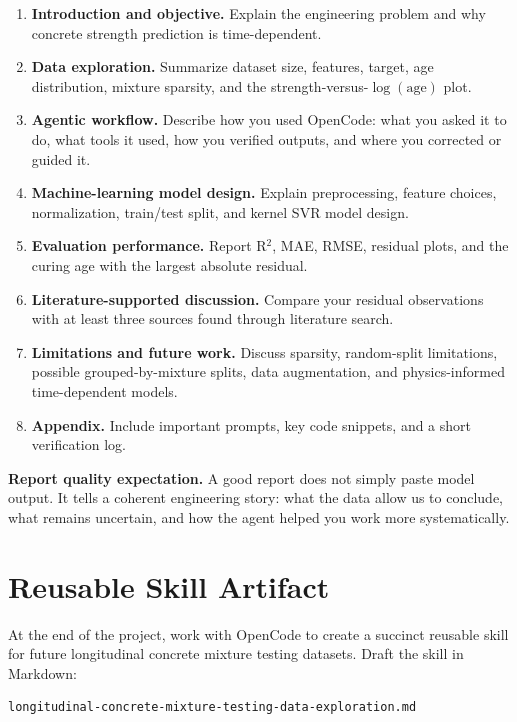 \documentclass[12pt]{article}
\begin{document}
\begin{enumerate}[label=\arabic*.]
  \item \textbf{Introduction and objective.}  Explain the engineering problem and why concrete strength prediction is time-dependent.
  \item \textbf{Data exploration.}  Summarize dataset size, features, target, age distribution, mixture sparsity, and the strength-versus-$\log(\text{age})$ plot.
  \item \textbf{Agentic workflow.}  Describe how you used OpenCode: what you asked it to do, what tools it used, how you verified outputs, and where you corrected or guided it.
  \item \textbf{Machine-learning model design.}  Explain preprocessing, feature choices, normalization, train/test split, and kernel SVR model design.
  \item \textbf{Evaluation performance.}  Report R$^2$, MAE, RMSE, residual plots, and the curing age with the largest absolute residual.
  \item \textbf{Literature-supported discussion.}  Compare your residual observations with at least three sources found through literature search.
  \item \textbf{Limitations and future work.}  Discuss sparsity, random-split limitations, possible grouped-by-mixture splits, data augmentation, and physics-informed time-dependent models.
  \item \textbf{Appendix.}  Include important prompts, key code snippets, and a short verification log.
\end{enumerate}

\begin{alert-box}
\textbf{Report quality expectation.}  A good report does not simply paste model output.  It tells a coherent engineering story: what the data allow us to conclude, what remains uncertain, and how the agent helped you work more systematically.
\end{alert-box}

\section{Reusable Skill Artifact}

At the end of the project, work with OpenCode to create a succinct reusable skill for future longitudinal concrete mixture testing datasets.  Draft the skill in Markdown:

\begin{lstlisting}[style=term]
longitudinal-concrete-mixture-testing-data-exploration.md
\end{lstlisting}
\end{document}
